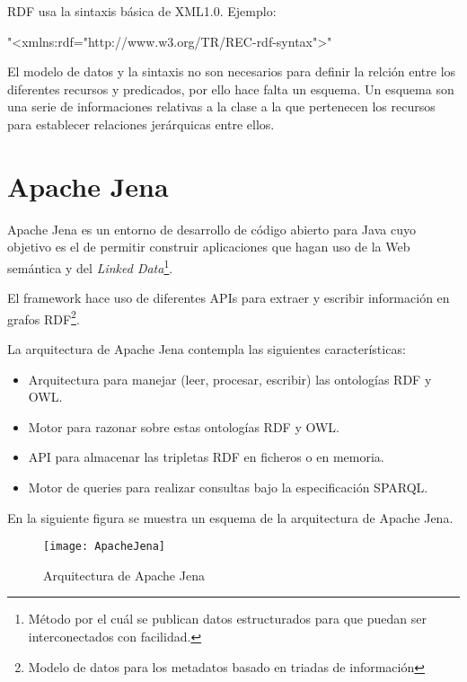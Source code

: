 \newpage
RDF usa la sintaxis básica de XML1.0. Ejemplo: 

"<xmlns:rdf="http://www.w3.org/TR/REC-rdf-syntax">"

El modelo de datos y la sintaxis no son necesarios para definir la relción entre los diferentes recursos y predicados, por ello hace falta un esquema.
Un esquema son una serie de informaciones relativas a la clase a la que pertenecen los recursos para establecer relaciones jerárquicas entre ellos.

\section{Apache Jena}

Apache Jena es un entorno de desarrollo de código abierto para Java cuyo objetivo es el de permitir construir aplicaciones que hagan uso de la Web semántica y del \textit{Linked Data}\footnote{Método por el cuál se publican datos estructurados para que puedan ser interconectados con facilidad.}. 

El framework hace uso de diferentes APIs para extraer y escribir información en grafos RDF\footnote{Modelo de datos para los metadatos basado en triadas de información}.\cite{wiki:jena}

La arquitectura de Apache Jena contempla las siguientes características:

\begin{itemize}
	\item{Arquitectura para manejar (leer, procesar, escribir) las ontologías RDF y OWL.}
	\item{Motor para razonar sobre estas ontologías RDF y OWL.}
	\item{API para almacenar las tripletas RDF en ficheros o en memoria.}
	\item{Motor de queries para realizar consultas bajo la especificación SPARQL.}\cite{jena}
\end{itemize}

En la siguiente figura se muestra un esquema de la arquitectura de Apache Jena.



\begin{figure}[tph]
    \begin{center}%
          \begin{center}%
            \texttt{[image: ApacheJena]}%
            \caption{Arquitectura de Apache Jena}%
            \label{figJena}%
          \end{center}%
    \end{center}%
  \end{figure}%

